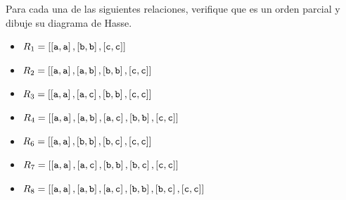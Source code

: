 	\begin{exmp}
		Para cada una de las siguientes relaciones, verifique que es un orden parcial y dibuje su diagrama de Hasse.
	\end{exmp}
	\begin{itemize}
		\item $\displaystyle R_{1}= \left[\left[\text{\texttt{a}}, \text{\texttt{a}}\right], \left[\text{\texttt{b}}, \text{\texttt{b}}\right], \left[\text{\texttt{c}}, \text{\texttt{c}}\right]\right] $
		\item $\displaystyle R_{2}= \left[\left[\text{\texttt{a}}, \text{\texttt{a}}\right], \left[\text{\texttt{a}}, \text{\texttt{b}}\right], \left[\text{\texttt{b}}, \text{\texttt{b}}\right], \left[\text{\texttt{c}}, \text{\texttt{c}}\right]\right] $
		\item $\displaystyle R_{3}= \left[\left[\text{\texttt{a}}, \text{\texttt{a}}\right], \left[\text{\texttt{a}}, \text{\texttt{c}}\right], \left[\text{\texttt{b}}, \text{\texttt{b}}\right], \left[\text{\texttt{c}}, \text{\texttt{c}}\right]\right] $
		\item $\displaystyle R_{4}= \left[\left[\text{\texttt{a}}, \text{\texttt{a}}\right], \left[\text{\texttt{a}}, \text{\texttt{b}}\right], \left[\text{\texttt{a}}, \text{\texttt{c}}\right], \left[\text{\texttt{b}}, \text{\texttt{b}}\right], \left[\text{\texttt{c}}, \text{\texttt{c}}\right]\right] $
		\item $\displaystyle R_{6}= \left[\left[\text{\texttt{a}}, \text{\texttt{a}}\right], \left[\text{\texttt{b}}, \text{\texttt{b}}\right], \left[\text{\texttt{b}}, \text{\texttt{c}}\right], \left[\text{\texttt{c}}, \text{\texttt{c}}\right]\right] $
		\item $\displaystyle R_{7}= \left[\left[\text{\texttt{a}}, \text{\texttt{a}}\right], \left[\text{\texttt{a}}, \text{\texttt{c}}\right], \left[\text{\texttt{b}}, \text{\texttt{b}}\right], \left[\text{\texttt{b}}, \text{\texttt{c}}\right], \left[\text{\texttt{c}}, \text{\texttt{c}}\right]\right] $
		\item $\displaystyle R_{8}= \left[\left[\text{\texttt{a}}, \text{\texttt{a}}\right], \left[\text{\texttt{a}}, \text{\texttt{b}}\right], \left[\text{\texttt{a}}, \text{\texttt{c}}\right], \left[\text{\texttt{b}}, \text{\texttt{b}}\right], \left[\text{\texttt{b}}, \text{\texttt{c}}\right], \left[\text{\texttt{c}}, \text{\texttt{c}}\right]\right] $
	\end{itemize}
	



